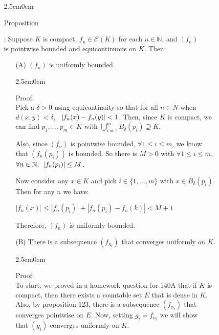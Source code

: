 \documentclass{book}
\newcommand{\hTwo}{%
   \color{MidnightBlue}%
   \fontsize{13}{15}\selectfont%
}
\newcommand{\hThree}{%
   \color{PineGreen!85!Orange}
   \fontsize{13}{15}\selectfont%
}
\newenvironment{myIndent}{%
   \begin{adjustwidth}{2.5em}{0em}%
}{%
   \end{adjustwidth}%
}
\newcommand{\myHS}{ \hspace{0.5em}}
\newcounter{PropNumber}
\newcommand{\propCount}[1][1]{%
   \addtocounter{PropNumber}{#1}%
   \thePropNumber%
}
\newcommand{\retTwo}{\hfill\bigbreak}
\begin{document}
{\begin{myIndent}\hTwo
   Proposition \propCount: Suppose $K$ is compact, $f_n \in \mathscr{C}(K)$ for each $n \in \mathbb{N}$, and $(f_n)$\\ is pointwise bounded and equicontinuous on $K$. Then:
   \begin{itemize}
      \item[(A)] $(f_n)$ is uniformly bounded.
      
      {\begin{myIndent}\hThree
         Proof:\\
         Pick a $\delta > 0$ using equicontinuity so that for all $n \in N$ when\\ $d(x, y) < \delta$, $\myHS|f_n(x) - f_n(y)| < 1$. Then, since $K$ is compact, we\\ can find $p_1, \ldots, p_m \in K$ with $\bigcup\limits_{i=1}^m B_\delta(p_i) \supseteq K$.\retTwo

         Also, since $(f_n)$ is pointwise bounded, $\forall 1 \leq i \leq m$, we know\\ that $(f_n(p_i))$ is bounded. So there is $M > 0$ with $\forall 1 \leq i \leq m$,\\ $\forall n \in \mathbb{N},\myHS |f_n(p_i)| \leq M$.\retTwo

         Now consider any $x \in K$ and pick $i \in \{1,\ldots,m\}$ with $x \in B_\delta(p_i)$.\\ Then for any $n$ we have:
         
         {\centering $|f_n(x)| \leq |f_n(p_i)| + |f_n(p_i) - f_n(k)| < M + 1$ \retTwo\par}

         Therefore, $(f_n)$ is uniformly bounded.
         \retTwo
      \end{myIndent}}

      \item[(B)] There is a subsequence $(f_{n_i})$ that converges uniformly on $K$. 
      
      {\begin{myIndent}\hThree
         Proof:\\
         To start, we proved in a homework question for 140A that if $K$ is\\ compact, then there exists a countable set $E$ that is dense in $K$.\\ Also, by proposition 123, there is a subsequence $(f_{n_i})$ that\\ converges pointwise on $E$. Now, setting $g_i = f_{n_i}$ we will show\\ that $(g_i)$  converges uniformly on $K$.\retTwo


\end{myIndent}}
\end{itemize}
\end{myIndent}}
\end{document}
